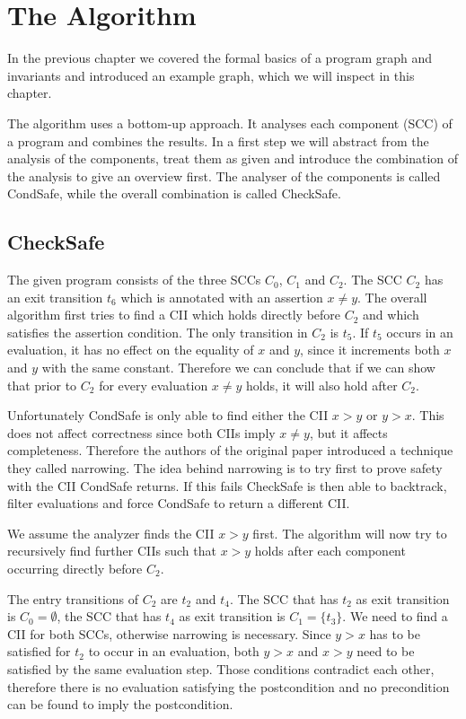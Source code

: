 \section{The Algorithm}
\label{sec:topic}

In the previous chapter we covered the formal basics of a program graph and invariants and introduced an example graph, which we will inspect in this chapter.

The algorithm uses a bottom-up approach. It analyses each component (SCC) of a program and combines the results.
In a first step we will abstract from the analysis of the components, treat them as given and introduce the combination of the analysis to give an overview first.
The analyser of the components is called CondSafe, while the overall combination is called CheckSafe.

\subsection{CheckSafe}

The given program consists of the three SCCs $C_0$, $C_1$ and $C_2$.
The SCC $C_2$ has an exit transition $t_6$ which is annotated with an assertion $x \neq y$.
The overall algorithm first tries to find a CII which holds directly before $C_2$ and which satisfies the assertion condition.
The only transition in $C_2$ is $t_5$. If $t_5$ occurs in an evaluation, it has no effect on the equality of $x$ and $y$, since it increments both $x$ and $y$ with the same constant.
Therefore we can conclude that if we can show that prior to $C_2$ for every evaluation $x \neq y$ holds, it will also hold after $C_2$.

Unfortunately CondSafe is only able to find either the CII $x > y$ or $y > x$. This does not affect correctness since both CIIs imply $x \neq y$, but it affects completeness.
Therefore the authors of the original paper introduced a technique they called narrowing.
The idea behind narrowing is to try first to prove safety with the CII CondSafe returns.
If this fails CheckSafe is then able to backtrack, filter evaluations and force CondSafe to return a different CII.

We assume the analyzer finds the CII $x > y$ first.
The algorithm will now try to recursively find further CIIs such that $x > y$ holds after each component occurring directly before $C_2$.

The entry transitions of $C_2$ are $t_2$ and $t_4$.
The SCC that has $t_2$ as exit transition is $C_0 = \emptyset$, the SCC that has $t_4$ as exit transition is $C_1 = \lbrace t_3 \rbrace$.
We need to find a CII for both SCCs, otherwise narrowing is necessary.
Since $y > x$ has to be satisfied for $t_2$ to occur in an evaluation, both $y > x$ and $x > y$ need to be satisfied by the same evaluation step.
Those conditions contradict each other, therefore there is no evaluation satisfying the postcondition and no precondition can be found to imply the postcondition.

